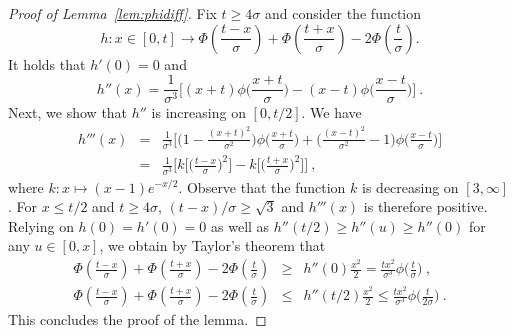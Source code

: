 \documentclass[twoside,11pt]{article}
\def\beqn{\begin{eqnarray*}}
\def\eeqn{\end{eqnarray*}}
\newcommand{\<}{\langle}
\renewcommand{\>}{\rangle}
\begin{document}
\begin{proof}[Proof of Lemma~\ref{lem:phidiff}]
Fix $t\geq 4\sigma$ and consider the function 
$$h :x \in [0,t] \rightarrow \Phi(\frac{t-x}{\sigma}) + \Phi(\frac{t+x}{\sigma}) -  2\Phi(\frac{t}{\sigma}).$$
It holds that $h'(0) = 0$ and 
\[h''(x) = \frac{1}{\sigma^3}\Big[(x+t)\phi\big(\frac{x+t}{\sigma}\big) - (x-t)\phi\big(\frac{x-t}{\sigma}\big)\Big]\ .\]
Next, we show that  $h''$ is increasing on $[0,t/2]$. We have 
\beqn 
h'''(x)& =& \frac{1}{\sigma^3}\Big[\big(1 - \frac{(x+t)^2}{\sigma^2}\big)\phi\big(\frac{x+t}{\sigma}\big)  + \big(\frac{(x-t)^2}{\sigma^2} -1\big)\phi\big(\frac{x-t}{\sigma}\big)\Big]\\
&= &\frac{1}{\sigma^3}\Big[k\big[\big(\frac{t-x}{\sigma}\big)^2\big] - k\big[\big(\frac{t+x}{\sigma}\big)^2\big]\Big]\ , 
\eeqn 
where $k:x\mapsto (x-1)e^{-x/2}$. Observe that the function $k$ is decreasing on $[3,\infty]$. For $x\leq t/2$ and $t\geq 4\sigma$, $(t-x)/\sigma\geq \sqrt{3}$
and $h'''(x)$ is therefore positive. Relying on $h(0)=h'(0)=0$ as well as $h''(t/2)\geq h''(u)\geq h''(0)$ for any $u\in [0,x]$, we obtain by Taylor's theorem that
\beqn 
\Phi(\frac{t-x}{\sigma}) + \Phi(\frac{t+x}{\sigma}) -  2\Phi(\frac{t}{\sigma}) 
&\geq& h''(0) \frac{x^2}{2}=
 \frac{tx^2}{\sigma^3}  \phi\big(\frac{t}{\sigma}\big)\ ,\\
\Phi(\frac{t-x}{\sigma}) + \Phi(\frac{t+x}{\sigma}) -  2\Phi(\frac{t}{\sigma}) 
&\leq& h''(t/2) \frac{x^2}{2}\leq 
 \frac{tx^2}{\sigma^3}  \phi\big(\frac{t}{2\sigma}\big)\ .
 \eeqn
This concludes the proof of the lemma. 
\end{proof}
















\end{document}
